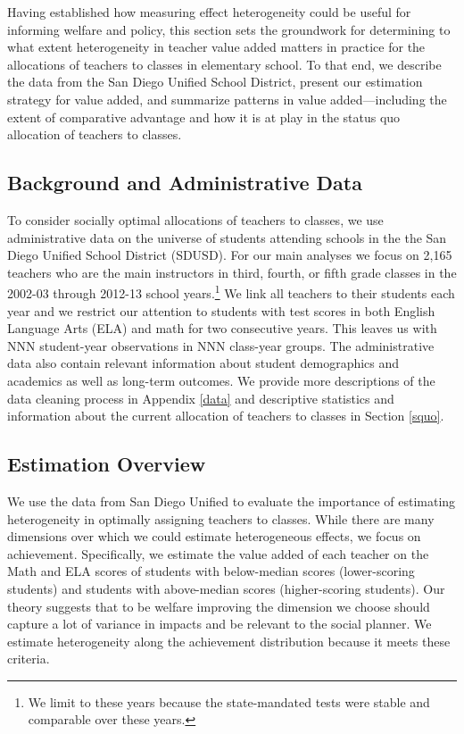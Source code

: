 \documentclass[12pt]{article}
\theoremstyle{definition}
\theoremstyle{definition}
\theoremstyle{definition}
\theoremstyle{definition}
\begin{document}
Having established how measuring effect heterogeneity could be useful for informing welfare and policy, this section sets the groundwork for determining to what extent heterogeneity in teacher value added matters in practice for the allocations of teachers to classes in elementary school. To that end, we describe the data from the San Diego Unified School District, present our estimation strategy for value added, and summarize patterns in value added---including the extent of comparative advantage and how it is at play in the status quo allocation of teachers to classes.

\subsection{Background and Administrative Data}

To consider socially optimal allocations of teachers to classes, we use administrative data on the universe of students attending schools in the the San Diego Unified School District (SDUSD). For our main analyses we focus on 2,165 teachers who are the main instructors in third, fourth, or fifth grade classes in the 2002-03 through 2012-13 school years.\footnote{We limit to these years because the state-mandated tests were stable and comparable over these years.} We link all teachers to their students each year and we restrict our attention to students with test scores in both English Language Arts (ELA) and math for two consecutive years. This leaves us with NNN student-year observations in NNN class-year groups. The administrative data also contain relevant information about student demographics and academics as well as long-term outcomes. We provide more descriptions of the data cleaning process in Appendix \ref{data} and descriptive statistics and information about the current allocation of teachers to classes in Section \ref{squo}.


\subsection{Estimation Overview}

We use the data from San Diego Unified to evaluate the importance of estimating heterogeneity in optimally assigning teachers to classes. While there are many dimensions over which we could estimate heterogeneous effects, we focus on achievement. Specifically, we estimate the value added of each teacher on the Math and ELA scores of students with below-median scores (lower-scoring students) and students with above-median scores (higher-scoring students). Our theory suggests that to be welfare improving the dimension we choose should capture a lot of variance in impacts and be relevant to the social planner. We estimate heterogeneity along the achievement distribution because it meets these criteria. 
\end{document}
